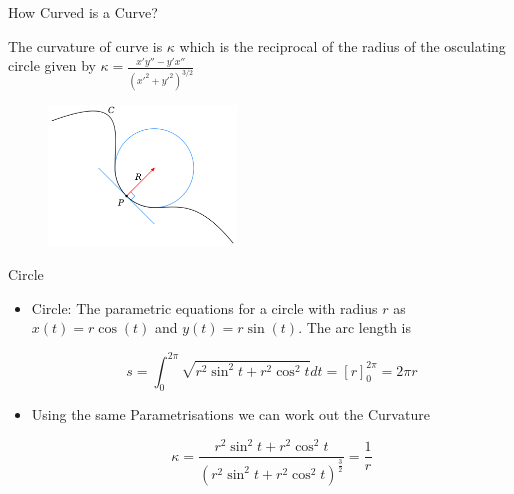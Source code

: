 \documentclass{beamer}
\begin{document}
\begin{frame}{How Curved is a Curve?}
	\begin{Theorem}[Curvature]
		The curvature of curve is $\kappa$ which is the reciprocal of the radius of the {\alert{osculating circle}} given by
		$\kappa=\frac{x' y'' - y' x''}{(x'^2+y'^2)^{3/2}}$
	\end{Theorem}
	\begin{figure}
	\centering
	\includegraphics[width=50mm, scale=0.4]{Curvature_circle.png}
\end{figure}
\end{frame}

\begin{frame}{Circle}
	\begin{itemize}	
		
		\item Circle: The parametric equations for a circle with radius $r$ as $x(t)=r \cos(t)$ and $y(t)= r \sin(t)$. The arc length is 
		
		\[	
		s = \int_{0}^{2 \pi} \sqrt{r^2 \sin^2 t + r^2 \cos^2 t}dt = \left[r \right]_{0}^{2 \pi} = 2 \pi r
		\]
	
		\item Using the same Parametrisations we can work out the Curvature
		
		\[
		\kappa = \frac{r^2 \sin^2 t + r^2 \cos^2 t}{\left(r^2 \sin^2 t + r^2 \cos^2 t \right) ^ \frac{3}{2}} = \frac{1}{r}
		\]
		
	\end{itemize}
\end{frame}
\end{document}

